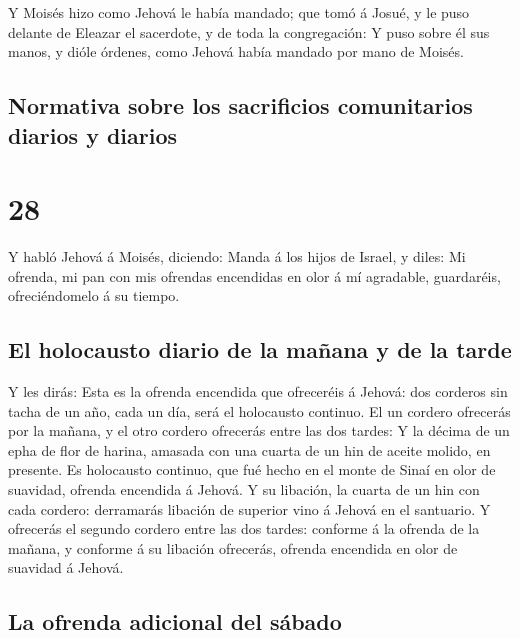  Y Moisés hizo como Jehová le había mandado; que tomó á
Josué, y le puso delante de Eleazar el sacerdote, y de toda la
congregación:  Y puso sobre él sus manos, y dióle
órdenes, como Jehová había mandado por mano de Moisés.

\hypertarget{normativa-sobre-los-sacrificios-comunitarios-diarios-y-diarios}{%
\subsection{Normativa sobre los sacrificios comunitarios diarios y
diarios}\label{normativa-sobre-los-sacrificios-comunitarios-diarios-y-diarios}}

\hypertarget{section-27}{%
\section{28}\label{section-27}}

 Y habló Jehová á Moisés, diciendo:  Manda á
los hijos de Israel, y diles: Mi ofrenda, mi pan con mis ofrendas
encendidas en olor á mí agradable, guardaréis, ofreciéndomelo á su
tiempo.

\hypertarget{el-holocausto-diario-de-la-mauxf1ana-y-de-la-tarde}{%
\subsection{El holocausto diario de la mañana y de la
tarde}\label{el-holocausto-diario-de-la-mauxf1ana-y-de-la-tarde}}

 Y les dirás: Esta es la ofrenda encendida que ofreceréis
á Jehová: dos corderos sin tacha de un año, cada un día, será el
holocausto continuo.  El un cordero ofrecerás por la
mañana, y el otro cordero ofrecerás entre las dos tardes: 
Y la décima de un epha de flor de harina, amasada con una cuarta de un
hin de aceite molido, en presente.  Es holocausto
continuo, que fué hecho en el monte de Sinaí en olor de suavidad,
ofrenda encendida á Jehová.  Y su libación, la cuarta de
un hin con cada cordero: derramarás libación de superior vino á Jehová
en el santuario.  Y ofrecerás el segundo cordero entre las
dos tardes: conforme á la ofrenda de la mañana, y conforme á su libación
ofrecerás, ofrenda encendida en olor de suavidad á Jehová.

\hypertarget{la-ofrenda-adicional-del-suxe1bado}{%
\subsection{La ofrenda adicional del
sábado}\label{la-ofrenda-adicional-del-suxe1bado}}

